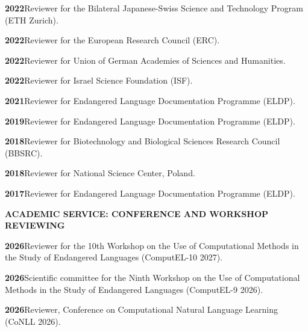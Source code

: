 \documentclass[11pt]{article}
\newcommand{\hangpara}{
 \setlength{\parindent}{0in} %
 \hangindent=0.42in %
}
\begin{document}
\vskip 6pt
\hangpara
{\bf 2022}\hspace{1ex}Reviewer for the Bilateral Japanese-Swiss Science and Technology Program (ETH Zurich).

\vskip 6pt
\hangpara
{\bf 2022}\hspace{1ex}Reviewer for the European Research Council (ERC).

\vskip 6pt
\hangpara
{\bf 2022}\hspace{1ex}Reviewer for Union of German Academies of Sciences and Humanities.

\vskip 6pt
\hangpara
{\bf 2022}\hspace{1ex}Reviewer for Israel Science Foundation (ISF).

\vskip 6pt
\hangpara
{\bf 2021}\hspace{1ex}Reviewer for Endangered Language Documentation Programme (ELDP).

\vskip 6pt
\hangpara
{\bf 2019}\hspace{1ex}Reviewer for Endangered Language Documentation Programme (ELDP).

\vskip 6pt
\hangpara
{\bf 2018}\hspace{1ex}Reviewer for Biotechnology and Biological Sciences Research Council (BBSRC).

\vskip 6pt
\hangpara
{\bf 2018}\hspace{1ex}Reviewer for National Science Center, Poland.

\vskip 6pt
\hangpara
{\bf 2017}\hspace{1ex}Reviewer for Endangered Language Documentation Programme (ELDP).

\clearpage
\vskip 20pt
\begin{flushleft}
{\bf ACADEMIC SERVICE: CONFERENCE AND WORKSHOP REVIEWING}
\end{flushleft}


\hangpara
{\bf 2026}\hspace{1ex}Reviewer for the 10th Workshop on the Use of Computational Methods in the Study of Endangered Languages (ComputEL-10 2027).

\hangpara
\vskip 6pt
{\bf 2026}\hspace{1ex}Scientific committee for the Ninth Workshop on the Use of Computational Methods in the Study of Endangered Languages (ComputEL-9 2026).

\hangpara
\vskip 6pt
{\bf 2026}\hspace{1ex}Reviewer, Conference on Computational Natural Language Learning (CoNLL 2026).
\end{document}
